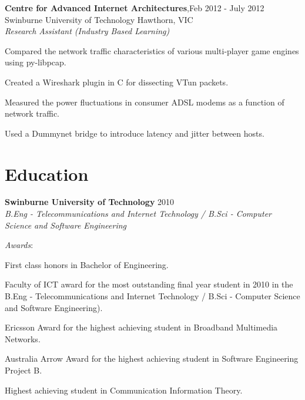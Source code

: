 \documentclass[line,margin]{res}
\begin{document}
\begin{resume}
        \textbf{Centre for Advanced Internet Architectures},\hfill Feb 2012 - July 2012 \\
        Swinburne University of Technology Hawthorn, VIC \\
        \textit{Research Assistant (Industry Based Learning)}\\
        
        \begin{list}{}{\leftmargin=1em \itemsep=-2pt}
            \item{Compared the network traffic characteristics of various multi-player game engines using
            py-libpcap.}
            \item{Created a Wireshark plugin in C for dissecting VTun packets.}
            \item{Measured the power fluctuations in consumer ADSL modems as a function of network traffic.}
            \item{Used a Dummynet bridge to introduce latency and jitter between hosts.}
        \end{list}

        \section{Education}
        \textbf{Swinburne University of Technology} \hfill 2010\\
        \textit{B.Eng - Telecommunications and Internet Technology / B.Sci - Computer Science and
        Software Engineering}

        \textit{Awards}:
        \begin{list}{}{\leftmargin=1em \itemsep=-2pt}
            \item{First class honors in Bachelor of Engineering.}
            \item{Faculty of ICT award for the most outstanding final year student in 2010 in the B.Eng -
            Telecommunications and Internet Technology / B.Sci - Computer Science and Software
            Engineering).}
            \item{Ericsson Award for the highest achieving student in Broadband Multimedia Networks.}
            \item{Australia Arrow Award for the highest achieving student in Software Engineering Project B.}
            \item{Highest achieving student in Communication Information Theory.}
        \end{list}


\end{resume}
\end{document}
